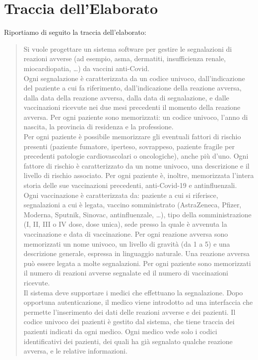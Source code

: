 \documentclass[11pt]{article}
\begin{document}
\newpage
    \section{Traccia dell'Elaborato}
    Riportiamo di seguito la traccia dell'elaborato:
        \begin{quotation}
            Si vuole progettare un sistema software per gestire le segnalazioni di reazioni avverse (ad esempio, asma, dermatiti, insufficienza renale, miocardiopatia, \dots) da vaccini anti-Covid.\\
            Ogni segnalazione è caratterizzata da un codice univoco, dall'indicazione del paziente a cui fa riferimento, dall'indicazione della reazione avversa, dalla data della reazione avversa, dalla data di segnalazione, e dalle vaccinazioni ricevute nei due mesi precedenti il momento della reazione avversa.
            Per ogni paziente sono memorizzati: un codice univoco, l'anno di nascita, la provincia di residenza e la professione.\\
            Per ogni paziente è possibile memorizzare gli eventuali fattori di rischio presenti (paziente fumatore, iperteso, sovrappeso, paziente fragile per precedenti patologie cardiovascolari o oncologiche), anche più d'uno. Ogni fattore di rischio è caratterizzato da un nome univoco, una descrizione e il livello di rischio associato. Per ogni paziente è, inoltre, memorizzata l'intera storia delle sue vaccinazioni precedenti, anti-Covid-19 e antinfluenzali.\\
            Ogni vaccinazione è caratterizzata da: paziente a cui si riferisce, segnalazioni a cui è legata, vaccino somministrato (AstraZeneca, Pfizer, Moderna, Sputnik, Sinovac, antinfluenzale, \dots), tipo della somministrazione (I, II, III o IV dose, dose unica), sede presso la quale è avvenuta la vaccinazione e data di vaccinazione. Per ogni reazione avversa sono memorizzati un nome univoco, un livello di gravità (da 1 a 5) e una descrizione generale, espressa in linguaggio naturale. Una reazione avversa può essere legata a molte segnalazioni. Per ogni paziente sono memorizzati il numero di reazioni avverse segnalate ed il numero di vaccinazioni ricevute.\\
            Il sistema deve supportare i medici che effettuano la segnalazione. Dopo opportuna autenticazione, il medico viene introdotto ad una interfaccia che permette l'inserimento dei dati delle reazioni avverse e dei pazienti. Il codice univoco dei pazienti è gestito dal sistema, che tiene traccia dei pazienti indicati da ogni medico. Ogni medico vede solo i codici identificativi dei pazienti, dei quali ha già segnalato qualche reazione avversa, e le relative informazioni.\\

\end{quotation}
\end{document}

